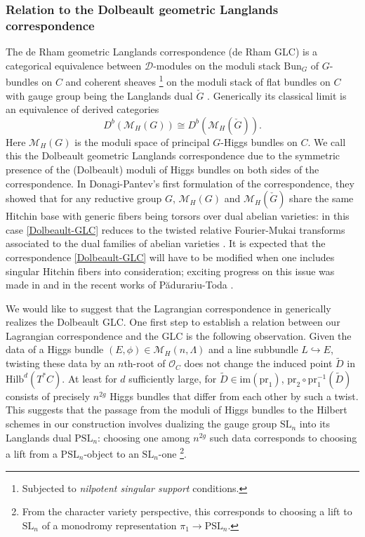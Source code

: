 \documentclass[twoside, 11pt]{article}
\numberwithin{equation}{section}
\theoremstyle{theorem}
\numberwithin{theorem}{section}
\theoremstyle{definition}
\begin{document}
\subsubsection{Relation to the Dolbeault geometric Langlands correspondence}
The de Rham geometric Langlands correspondence (de Rham GLC) is a categorical equivalence between $\mathcal{D}$-modules on the moduli stack $\mathrm{Bun}_G$ of $G$-bundles on $C$ and coherent sheaves 
\footnote{Subjected to \textit{nilpotent singular support} conditions.}
on the moduli stack of flat bundles on $C$ 
with gauge group being the Langlands dual $\check{G}$ \cite{BD92, GLC-proof}.
Generically its classical limit is an equivalence of derived categories 
\begin{equation}\label{Dolbeault-GLC}
D^b\left( \mathcal{M}_H(G) \right) \cong D^b\left( \mathcal{M}_H(\check{G}) \right).    
\end{equation}
Here $\mathcal{M}_H(G)$ is the moduli space of principal $G$-Higgs bundles on $C$.
We call this the Dolbeault geometric Langlands correspondence due to the symmetric presence of the (Dolbeault) moduli of Higgs bundles on both sides of the correspondence. 
In Donagi-Pantev's first formulation of the correspondence, they showed that for any reductive group $G$, $\mathcal{M}_H(G)$ and $\mathcal{M}_H(\check{G})$ share the same Hitchin base with generic fibers being torsors over dual abelian varieties: in this case \eqref{Dolbeault-GLC} reduces to the twisted relative Fourier-Mukai transforms associated to the dual families of abelian varieties \cite{DonagiPantev2012}. 
It is expected that the correspondence \eqref{Dolbeault-GLC} will have to be modified when one includes singular Hitchin fibers into consideration; 
exciting progress on this issue was made in \cite{ArinkinFedorov2016, Arinkin2012, Li2018} and in the recent works of Pădurariu-Toda \cite{PT25}.

We would like to suggest that the Lagrangian correspondence in  generically realizes the Dolbeault GLC.
One first step to establish a relation between our Lagrangian correspondence and the GLC is the following observation. Given the data of a Higgs bundle $(E, \phi) \in \mathcal{M}_H(n, \Lambda)$ 
and a line subbundle $L \hookrightarrow E$, twisting these data by an $n$th-root of $\mathcal{O}_C$ does not change the induced point $\widetilde{D}$ in  $\mathrm{Hilb}^d(T^\ast C)$. At least for $d$ sufficiently large, for $\widetilde{D} \in \mathrm{im}(\mathrm{pr}_1)$, $\mathrm{pr}_{2} \circ \mathrm{pr}_1^{-1}(\widetilde{D})$ consists of precisely $n^{2g}$ Higgs bundles that differ from each other by such a twist. 
This suggests that the passage from the moduli of Higgs bundles to the Hilbert schemes in our construction involves dualizing the gauge group  $\mathrm{SL}_n$ into its Langlands dual $\mathrm{PSL}_n$: choosing one among $n^{2g}$ such data corresponds to choosing a lift from a $\mathrm{PSL}_n$-object to an $\mathrm{SL}_n$-one
\footnote{From the character variety perspective, this corresponds to choosing a lift to $\mathrm{SL}_n$ of a monodromy representation $\pi_1 \rightarrow \mathrm{PSL}_n$.}.
\end{document}
